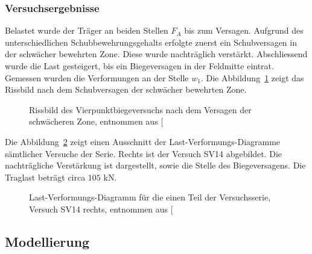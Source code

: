 \documentclass[
  11pt,
  letterpaper,
]{scrreprt}
\begin{document}
\subsubsection{Versuchsergebnisse}\label{versuchsergebnisse-1}

Belastet wurde der Träger an beiden Stellen \(F_A\) bis zum Versagen.
Aufgrund des unterschiedlichen Schubbewehrungsgehalts erfolgte zuerst
ein Schubversagen in der schwächer bewehrten Zone. Diese wurde
nachträglich verstärkt. Abschliessend wurde die Last gesteigert, bis ein
Biegeversagen in der Feldmitte eintrat. Gemessen wurden die Verformungen
an der Stelle \(w_1\). Die Abbildung~\ref{fig-sv14_versuchsres_1} zeigt
das Rissbild nach dem Schubversagen der schwächer bewehrten Zone.

\begin{figure}[H]


\caption{\label{fig-sv14_versuchsres_1}Rissbild des
Vierpunktbiegeversuchs nach dem Versagen der schwächeren Zone, entnommen
aus {[}\citeproc{ref-tue_einfluss_2019}{3}{]}}

\end{figure}%

Die Abbildung~\ref{fig-sv14_versuchsres_2} zeigt einen Ausschnitt der
Last-Verformungs-Diagramme sämtlicher Versuche der Serie. Rechts ist der
Versuch SV14 abgebildet. Die nachträgliche Verstärkung ist dargestellt,
sowie die Stelle des Biegeversagens. Die Traglast beträgt circa \(105\)
kN.

\begin{figure}[H]


\caption{\label{fig-sv14_versuchsres_2}Last-Verformungs-Diagramm für die
einen Teil der Versuchsserie, Versuch SV14 rechts, entnommen aus
{[}\citeproc{ref-tue_einfluss_2019}{3}{]}}

\end{figure}%

\subsection{Modellierung}\label{modellierung-1}
\end{document}
